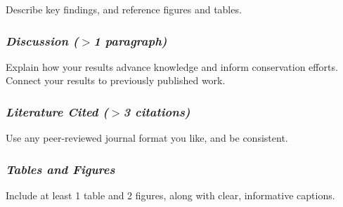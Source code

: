 \documentclass[12pt]{article}
\begin{document}
Describe key findings, and reference figures and tables.

\subsubsection*{\it Discussion \normalfont ($>$1 paragraph)}

Explain how your results advance knowledge and inform conservation
efforts. Connect your results to previously published work.

\subsubsection*{\it Literature Cited \normalfont ($>$3 citations)}

Use any peer-reviewed journal format you like, and be consistent.

\subsubsection*{\it Tables and Figures}

Include at least 1 table and 2 figures, along with
clear, informative captions. 
\end{document}
